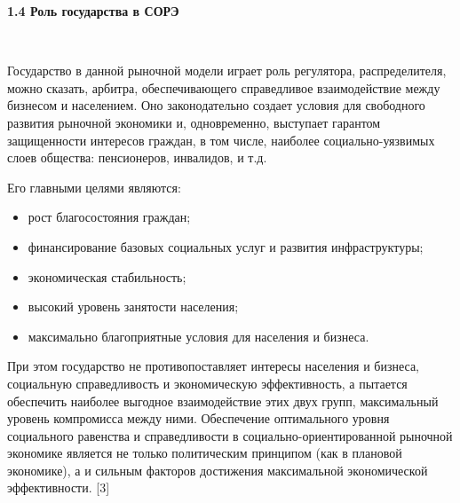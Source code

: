 \documentclass[14pt,a4paper]{article}
\begin{document}
    \begin{center}
        \textbf{1.4 Роль государства в СОРЭ}
    \end{center}
    \\
    \par
    Государство в данной рыночной модели играет роль регулятора, распределителя,
    можно сказать, арбитра, обеспечивающего справедливое взаимодействие между бизнесом и
    населением. Оно законодательно создает условия для свободного развития рыночной экономики и,
    одновременно, выступает гарантом защищенности интересов граждан, в том числе, наиболее
    социально-уязвимых слоев общества: пенсионеров, инвалидов, и т.д.
    \par
    Его главными целями являются:
    \begin{itemize}
        \item рост благосостояния граждан;
        \item финансирование базовых социальных услуг и развития инфраструктуры;
        \item экономическая стабильность;
        \item высокий уровень занятости населения;
        \item максимально благоприятные условия для населения и бизнеса.
    \end{itemize}
    \par
    При этом государство не противопоставляет интересы населения и бизнеса, социальную
    справедливость и экономическую эффективность, а пытается обеспечить наиболее выгодное
    взаимодействие этих двух групп, максимальный уровень компромисса между ними.
    Обеспечение оптимального уровня социального равенства и справедливости в
    социально-ориентированной рыночной экономике является не только политическим принципом
    (как в плановой экономике), а и сильным факторов достижения максимальной экономической
    эффективности. [3]
    \par
\end{document}
